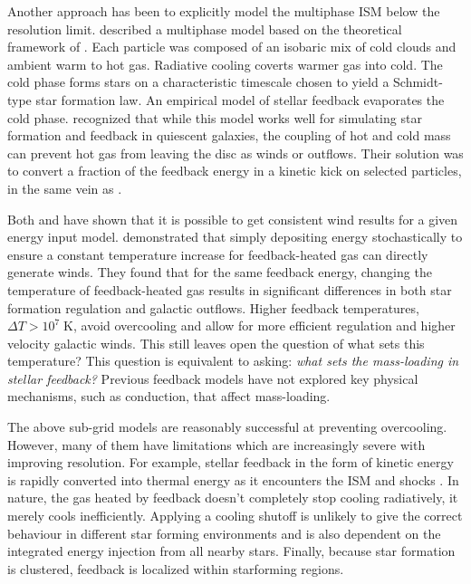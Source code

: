 Another approach has been to explicitly model the multiphase ISM
below the resolution limit.  \citet{Springel2003} described a multiphase
model based on the theoretical framework of \citet{McKee1977}.  Each
particle was composed of an isobaric mix of cold clouds and ambient warm
to hot gas.  Radiative cooling coverts warmer gas into cold.  The cold
phase forms stars on a characteristic timescale chosen to yield a
Schmidt-type star formation law.  An empirical model of stellar feedback
evaporates the cold phase.  \citet{Springel2003} recognized that while
this model works well for simulating star formation and feedback in
quiescent galaxies, the coupling of hot and cold mass can prevent hot
gas from leaving the disc as winds or outflows.  Their solution was to
convert a fraction of the feedback energy in a kinetic kick on selected
particles, in the same vein as \citet{Mihos1994}.  

Both \citet{DallaVecchia2012} and \cite{Hopkins2012b} have shown
that it is possible to get consistent wind results for a given energy input model.   
\citet{DallaVecchia2012} demonstrated that simply depositing 
 energy stochastically to ensure a constant temperature increase for 
feedback-heated gas can directly generate winds.    
They found that for the same feedback energy,
changing the temperature of feedback-heated gas results in significant
differences in both star formation regulation and galactic outflows.  Higher
feedback temperatures, $\Delta T > 10^7\;\mathrm{K}$, avoid overcooling and
allow for more efficient regulation and higher velocity galactic winds.  
This still leaves open the question of what sets this temperature?  
This question is equivalent to asking: {\it what sets the mass-loading in stellar
feedback?}   Previous feedback models have not explored key
physical mechanisms, such as conduction, that affect mass-loading.

The above sub-grid models are reasonably successful at preventing
overcooling.  However, many of them have limitations which are
increasingly severe with improving resolution.  For example, stellar feedback
in the form of kinetic energy is rapidly converted into thermal energy as it
encounters the ISM and shocks \citep{Durier2012}.  In nature,
the gas heated by feedback doesn't completely stop cooling radiatively, it
merely cools inefficiently.  Applying a cooling shutoff is unlikely to give the
correct behaviour in different star forming environments and is also dependent
on the integrated energy injection from all nearby stars.  Finally, because
star formation is clustered, feedback is localized within starforming regions. 

